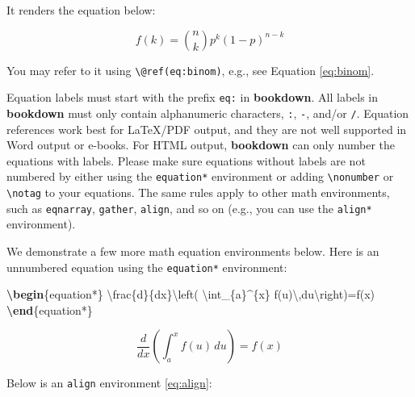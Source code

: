 \documentclass[
  12pt,
]{krantz}
\makeatletter
\newenvironment{Shaded}{\begin{snugshade}}{\end{snugshade}}
\newcommand{\ExtensionTok}[1]{#1}
\newcommand{\KeywordTok}[1]{\textcolor[rgb]{0.13,0.29,0.53}{\textbf{#1}}}
\newcommand{\NormalTok}[1]{#1}
\newcommand{\SpecialCharTok}[1]{\textcolor[rgb]{0.00,0.00,0.00}{#1}}
\newcommand{\SpecialStringTok}[1]{\textcolor[rgb]{0.31,0.60,0.02}{#1}}
\newenvironment{kframe}{%
\medskip{}
\setlength{\fboxsep}{.8em}
 \def\at@end@of@kframe{}%
 \ifinner\ifhmode%
  \def\at@end@of@kframe{\end{minipage}}%
  \begin{minipage}{\columnwidth}%
 \fi\fi%
 \def\FrameCommand##1{\hskip\@totalleftmargin \hskip-\fboxsep
 \colorbox{shadecolor}{##1}\hskip-\fboxsep
     \hskip-\linewidth \hskip-\@totalleftmargin \hskip\columnwidth}%
 \MakeFramed {\advance\hsize-\width
   \@totalleftmargin\z@ \linewidth\hsize
   \@setminipage}}%
 {\par\unskip\endMakeFramed%
 \at@end@of@kframe}
\newenvironment{rmdblock}[1]
  {
  \begin{itemize}
  \renewcommand{\labelitemi}{
    \raisebox{-.7\height}[0pt][0pt]{
      {\setkeys{Gin}{width=3em,keepaspectratio}\texttt{[image: images/\#1]}}
    }
  }
  \setlength{\fboxsep}{1em}
  \begin{kframe}
  \item
  }
  {
  \end{kframe}
  \end{itemize}
  }
\newenvironment{rmdcaution}
  {\begin{rmdblock}{caution}}
  {\end{rmdblock}}
\theoremstyle{definition}
\theoremstyle{definition}
\theoremstyle{definition}
\theoremstyle{definition}
\theoremstyle{remark}
\makeatother
\begin{document}
It renders the equation below:

\begin{equation}
f\left(k\right)=\binom{n}{k}p^k\left(1-p\right)^{n-k} \label{eq:binom}
\end{equation}

You may refer to it using \texttt{\textbackslash{}@ref(eq:binom)}, e.g., see Equation \eqref{eq:binom}.

\begin{rmdcaution}
Equation labels must start with the prefix \texttt{eq:} in \textbf{bookdown}. All labels in \textbf{bookdown} must only contain alphanumeric characters, \texttt{:}, \texttt{-}, and/or \texttt{/}. Equation references work best for LaTeX/PDF output, and they are not well supported in Word output or e-books. For HTML output, \textbf{bookdown} can only number the equations with labels. Please make sure equations without labels are not numbered by either using the \texttt{equation*} environment or adding \texttt{\textbackslash{}nonumber} or \texttt{\textbackslash{}notag} to your equations. The same rules apply to other math environments, such as \texttt{eqnarray}, \texttt{gather}, \texttt{align}, and so on (e.g., you can use the \texttt{align*} environment).
\end{rmdcaution}

We demonstrate a few more math equation environments below. Here is an unnumbered equation using the \texttt{equation*} environment:

\begin{Shaded}
\begin{Highlighting}[]
\KeywordTok{\textbackslash{}begin}\NormalTok{\{}\ExtensionTok{equation*}\NormalTok{\}}\SpecialStringTok{ }
\SpecialCharTok{\textbackslash{}frac}\SpecialStringTok{\{d\}\{dx\}}\SpecialCharTok{\textbackslash{}left}\SpecialStringTok{( }\SpecialCharTok{\textbackslash{}int}\SpecialStringTok{\_\{a\}\^{}\{x\} f(u)}\SpecialCharTok{\textbackslash{},}\SpecialStringTok{du}\SpecialCharTok{\textbackslash{}right}\SpecialStringTok{)=f(x)}
\KeywordTok{\textbackslash{}end}\NormalTok{\{}\ExtensionTok{equation*}\NormalTok{\} }
\end{Highlighting}
\end{Shaded}

\begin{equation*}
\frac{d}{dx}\left( \int_{a}^{x} f(u)\,du\right)=f(x)
\end{equation*}

Below is an \texttt{align} environment \eqref{eq:align}:
\end{document}
